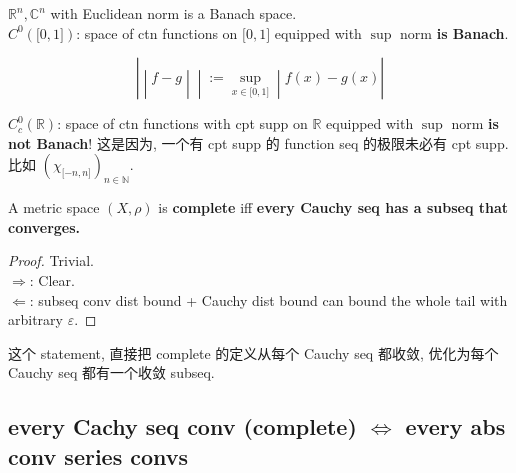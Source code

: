 \begin{example}

\(\mathbb{R}^{n},\mathbb{C}^{n}\) with Euclidean norm is a Banach space.\\
\(C^{0}(\lbrack 0,1\rbrack)\): space of ctn functions on \(\lbrack 0,1\rbrack\) equipped with \(\sup\) norm \textbf{is Banach}.

\[\left. | \middle| f - g \middle| \middle| := \sup\limits_{x \in \lbrack 0,1\rbrack} \middle| f(x) - g(x)| \right.\]

\(C_{c}^{0}(\mathbb{R})\): space of ctn functions with cpt supp on \(\mathbb{R}\) equipped with \(\sup\) norm \textbf{is not Banach}! 这是因为, 一个有 cpt supp 的 function seq 的极限未必有 cpt supp. 比如 \((\chi_{\lbrack - n,n\rbrack})_{n \in \mathbb{N}}\).

\end{example}

\begin{lemma}

A metric space \((X,\rho)\) is \textbf{complete} iff \textbf{every Cauchy seq has a subseq that converges.}

\end{lemma}

\begin{proof}

Trivial.\\
\(\Longrightarrow\): Clear.\\
\(\Longleftarrow\): subseq conv dist bound + Cauchy dist bound can bound the whole tail with arbitrary \(\varepsilon\).

\end{proof}

这个 statement, 直接把 complete 的定义从每个 Cauchy seq 都收敛, 优化为每个 Cauchy seq 都有一个收敛 subseq.

\subsection{\texorpdfstring{every Cachy seq conv (complete) \(\Leftrightarrow\) every abs conv series convs}{every Cachy seq conv (complete) \textbackslash Leftrightarrow every abs conv series convs}}


